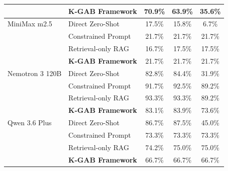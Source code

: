 \begin{table}[htbp]
\begin{tabular}{llccc}
 & \textbf{K-GAB Framework} & 70.9\% & 63.9\% & 35.6\% \\
\midrule
MiniMax m2.5 & Direct Zero-Shot & 17.5\% & 15.8\% & 6.7\% \\
 & Constrained Prompt & 21.7\% & 21.7\% & 21.7\% \\
 & Retrieval-only RAG & 16.7\% & 17.5\% & 17.5\% \\
 & \textbf{K-GAB Framework} & 21.7\% & 21.7\% & 21.7\% \\
\midrule
Nemotron 3 120B & Direct Zero-Shot & 82.8\% & 84.4\% & 31.9\% \\
 & Constrained Prompt & 91.7\% & 92.5\% & 89.2\% \\
 & Retrieval-only RAG & 93.3\% & 93.3\% & 89.2\% \\
 & \textbf{K-GAB Framework} & 83.1\% & 83.9\% & 73.6\% \\
\midrule
Qwen 3.6 Plus & Direct Zero-Shot & 86.7\% & 87.5\% & 45.0\% \\
 & Constrained Prompt & 73.3\% & 73.3\% & 73.3\% \\
 & Retrieval-only RAG & 74.2\% & 75.0\% & 75.0\% \\
 & \textbf{K-GAB Framework} & 66.7\% & 66.7\% & 66.7\% \\

\bottomrule
\end{tabular}
\label{tab:benchmark_results}
\end{table}